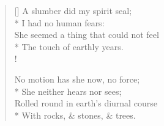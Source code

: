 \documentclass[MAIN]{subfiles}
\begin{document}
\settowidth{\versewidth}{A slumber did my spirit seal}
\begin{verse}[\versewidth]
A slumber did my spirit seal;\\*
\vin I had no human fears:\\
She seemed a thing that could not feel\\*
\vin The touch of earthly years.\\!

No motion has she now, no force;\\*
\vin She neither hears nor sees;\\
Rolled round in earth's diurnal course\\*
\vin With rocks, \& stones, \& trees.
\end{verse}
\end{document}
